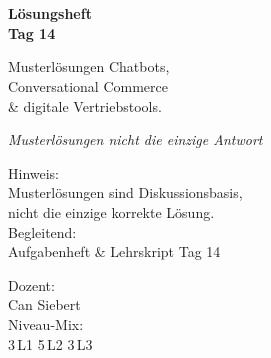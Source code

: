 \documentclass[11pt,a4paper,oneside]{article}
\newcommand{\caveatfontfallback}{\itshape}
\newcommand\caveatfont{\caveatfontfallback}%
\begin{document}
\begin{titlepage}
  \pagestyle{empty}
  \vspace*{1.5cm}
  \\[2pt]
  \noindent{\color{lpAccent}\rule{\linewidth}{1.2pt}}\\[4pt]

  \vspace{3cm}
  {\sffamily\fontsize{30}{34}\selectfont\bfseries\color{lpInk}Lösungsheft\\Tag 14\par}

  \vspace{0.7cm}
  {\sffamily\large\color{lpGray}Musterlösungen \textendash{} Chatbots,\\Conversational Commerce\\\& digitale Vertriebstools.\par}

  \vspace{1.5cm}
  {\caveatfont\LARGE\color{lpGreen}Musterlösungen \textperiodcentered{} nicht die einzige Antwort}\par

  \vfill

  \noindent\begin{minipage}{0.55\linewidth}
    {\sffamily\footnotesize\color{lpGray}Hinweis:}\\
    {\sffamily\small\color{lpInk}Musterlösungen sind Diskussionsbasis,\\nicht die einzige korrekte Lösung.}\\[10pt]
    {\sffamily\footnotesize\color{lpGray}Begleitend:}\\
    {\sffamily\small\color{lpInk}Aufgabenheft \& Lehrskript Tag 14}
  \end{minipage}\hfill
  \begin{minipage}{0.4\linewidth}
    \raggedleft
    {\sffamily\footnotesize\color{lpGray}Dozent:}\\
    {\sffamily\small\color{lpInk}Can Siebert}\\[10pt]
    {\sffamily\footnotesize\color{lpGray}Niveau-Mix:}\\
    {\sffamily\small\color{lpInk}3\,L1 \textperiodcentered{} 5\,L2 \textperiodcentered{} 3\,L3}
  \end{minipage}

  \vspace{0.5cm}
  \noindent{\color{lpAccent}\rule{\linewidth}{0.6pt}}
\end{titlepage}
\end{document}
